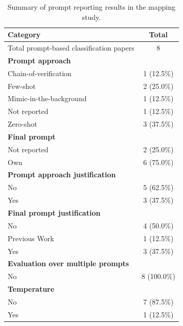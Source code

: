 \documentclass[a4paper]{article}
\begin{document}
\begin{table}[H]
	\centering
	\captionsetup{justification=centering}
	\caption{Summary of prompt reporting results in the mapping study.}
	\begin{tabularx}{0.7\textwidth}{|X|c|}
		\hline
		\textbf{Category} & \textbf{Total} \\
		\hline
		Total prompt-based classification papers & 8 \\
		\hline
		\textbf{Prompt approach} & \\
		\hspace{3mm} Chain-of-verification & 1 (12.5\%)  \\
		\hspace{3mm} Few-shot & 2 (25.0\%)  \\
		\hspace{3mm} Mimic-in-the-background & 1 (12.5\%) \\
		\hspace{3mm} Not reported & 1 (12.5\%) \\
		\hspace{3mm} Zero-shot & 3 (37.5\%)  \\
		\textbf{Final prompt} &\\
		\hspace{3mm} Not reported & 2 (25.0\%)\\
		\hspace{3mm} Own & 6 (75.0\%) \\
		\textbf{Prompt approach justification} &\\
		\hspace{3mm} No & 5 (62.5\%)  \\
		\hspace{3mm} Yes & 3 (37.5\%)  \\
		\textbf{Final prompt justification} & \\
		\hspace{3mm} No & 4 (50.0\%)  \\
		\hspace{3mm} Previous Work & 1 (12.5\%) \\
		\hspace{3mm} Yes & 3 (37.5\%)  \\
		\textbf{Evaluation over multiple prompts} &\\
		\hspace{3mm} No & 8 (100.0\%) \\
		\textbf{Temperature} & \\
		\hspace{3mm} No & 7 (87.5\%) \\
		\hspace{3mm} Yes & 1 (12.5\%) \\
		\hline
	\end{tabularx}
	\label{table:prompt_results}
\end{table}
\end{document}
